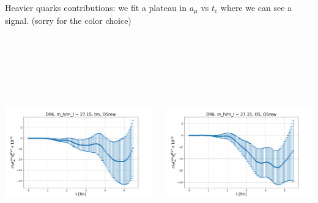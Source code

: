 \documentclass[xcolor={dvipsnames,table}]{beamer}
\begin{document}
\begin{frame}
 Heavier quarks contributions: we fit a plateau in $a_\mu$ vs $t_c$ where we can see a signal. (sorry for the color choice)\vfill \,

    \

    \
    
    \
    
    \begin{columns}
    \begin{column}{0.5\textwidth}
     \includegraphics[trim=0cm 0.3cm 0cm 1.2cm, clip,width=\textwidth]{plots/der_mq_sea_lore/amu_D96_tm_der_027ml.png}
    \end{column}
    \begin{column}{0.5\textwidth}
     \includegraphics[trim=0cm 0.3cm 0cm 1.2cm, clip,width=\textwidth]{plots/der_mq_sea_lore/amu_D96_OS_der_027ml.png}
    \end{column}
   \end{columns}
   \

   \

   \

   \
\end{frame}
\end{document}
